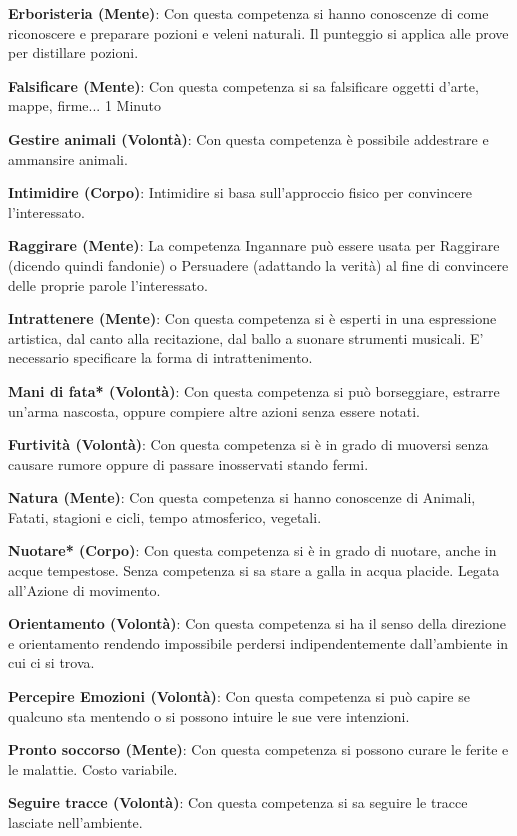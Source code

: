 \documentclass[12pt,a4paper,twoside,openany]{book}
\begin{document}
\begin{multicols}{2}
\textbf{Erboristeria (Mente)}: Con questa competenza si hanno conoscenze di come riconoscere e preparare pozioni e veleni naturali. Il punteggio si applica alle prove per distillare pozioni.

\textbf{Falsificare (Mente)}: Con questa competenza si sa falsificare oggetti d'arte, mappe, firme... 1 Minuto

\textbf{Gestire animali (Volontà)}: Con questa competenza è possibile addestrare e ammansire animali.

\textbf{Intimidire (Corpo)}: Intimidire si basa sull'approccio fisico per convincere l'interessato. 

\textbf{Raggirare (Mente)}: La competenza Ingannare può essere usata per Raggirare (dicendo quindi fandonie) o Persuadere (adattando la verità) al fine di convincere delle proprie parole l'interessato.

\textbf{Intrattenere (Mente)}: Con questa competenza si è esperti in una espressione artistica, dal canto alla recitazione, dal ballo a suonare strumenti musicali. E' necessario specificare la forma di intrattenimento.

\textbf{Mani di fata* (Volontà)}: Con questa competenza si può borseggiare, estrarre un'arma nascosta, oppure compiere altre azioni senza essere notati. 

\textbf{Furtività (Volontà)}: Con questa competenza si è in grado di muoversi senza causare rumore oppure di passare inosservati stando fermi. 

\textbf{Natura (Mente)}: Con questa competenza si hanno conoscenze di Animali, Fatati, stagioni e cicli, tempo atmosferico, vegetali. 

\textbf{Nuotare* (Corpo)}: Con questa competenza si è in grado di nuotare, anche in acque tempestose. Senza competenza si sa stare a galla in acqua placide. Legata all'Azione di movimento.

\textbf{Orientamento (Volontà)}: Con questa competenza si ha il senso della direzione e orientamento rendendo impossibile perdersi indipendentemente dall'ambiente in cui ci si trova. 

\textbf{Percepire Emozioni (Volontà)}: Con questa competenza si può capire se qualcuno sta mentendo o si possono intuire le sue vere intenzioni.

\textbf{Pronto soccorso (Mente)}: Con questa competenza si possono curare le ferite e le malattie. Costo variabile.

\textbf{Seguire tracce (Volontà)}: Con questa competenza si sa seguire le tracce lasciate nell'ambiente. 


\end{multicols}
\end{document}

